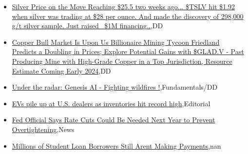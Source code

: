 \documentclass{article}%
\begin{document}
%
\begin{itemize}%
\item%
\href{https://reddit.com/r/Baystreetbets/comments/18lk2ww/silver\_price\_on\_the\_move\_reaching\_255\_two\_weeks/}{Silver Price on the Move Reaching \$25.5 two weeks ago... \$TSLV hit \$1.92 when silver was trading at \$28 per ounce. And made the discovery of 298,000 g/t silver sample. Just raised ~\$1M financing..},DD%
\item%
\href{https://reddit.com/r/Baystreetbets/comments/18lfit4/copper\_bull\_market\_is\_upon\_us\_billionaire\_mining/}{Copper Bull Market Is Upon Us  Billionaire Mining Tycoon Friedland Predicts a Doubling in Prices; Explore Potential Gains with \$GLAD.V - Past Producing Mine with High-Grade Copper in a Top Jurisdiction, Resource Estimate Coming Early 2024},DD%
\item%
\href{https://reddit.com/r/StockMarket/comments/18lxhu3/under\_the\_radar\_genesis\_ai\_fighting\_wildfires/}{Under the radar: Genesis AI - Fighting wildfires !},Fundamentals/DD%
\item%
\href{https://reddit.com/r/Economics/comments/18luvde/evs\_pile\_up\_at\_us\_dealers\_as\_inventories\_hit/}{EVs pile up at U.S. dealers as inventories hit record high},Editorial%
\item%
\href{https://reddit.com/r/Economics/comments/18llbhg/fed\_official\_says\_rate\_cuts\_could\_be\_needed\_next/}{Fed Official Says Rate Cuts Could Be Needed Next Year to Prevent Overtightening},News%
\item%
\href{https://reddit.com/r/Economics/comments/18lf1tf/millions\_of\_student\_loan\_borrowers\_still\_arent/}{Millions of Student Loan Borrowers Still Arent Making Payments},nan%
\end{itemize}%
\end{document}
